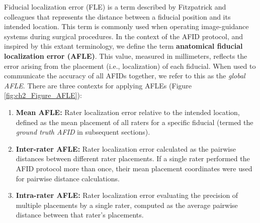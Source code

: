\newpage
Fiducial localization error (FLE) is a term described by Fitzpatrick and colleagues \cite{Fitzpatrick1998-hp} that represents the distance between a fiducial position and its intended location. This term is commonly used when operating image-guidance systems during surgical procedures. In the context of the AFID protocol, and inspired by this extant terminology, we define the term \textbf{anatomical fiducial localization error (AFLE)}. This value, measured in millimeters, reflects the error arising from the placement (i.e., localization) of each fiducial. When used to communicate the accuracy of all AFIDs together, we refer to this as the \emph{global AFLE}. There are three contexts for applying AFLEs (Figure \ref{fig:ch2_Figure_AFLE}):
\begin{enumerate}
    \item \textbf{Mean AFLE:} Rater localization error relative to the intended location, defined as the mean placement of all raters for a specific fiducial (termed the \emph{ground truth AFID} in subsequent sections).
    \item \textbf{Inter-rater AFLE:} Rater localization error calculated as the pairwise distances between different rater placements. If a single rater performed the AFID protocol more than once, their mean placement coordinates were used for pairwise distance calculations.
    \item \textbf{Intra-rater AFLE:} Rater localization error evaluating the precision of multiple placements by a single rater, computed as the average pairwise distance between that rater’s placements.
\end{enumerate}


